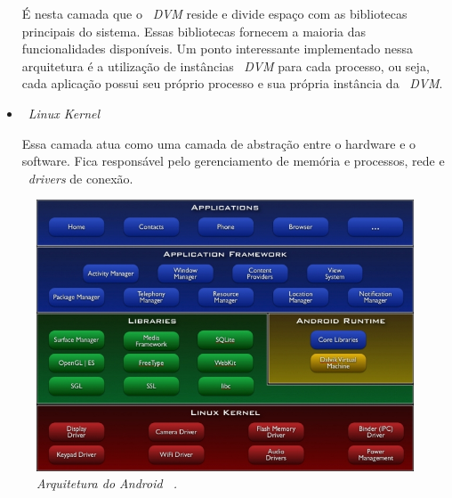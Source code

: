 \begin{itemize}
				É nesta camada que o ~\textit{DVM} reside e divide espaço com as bibliotecas principais do
				sistema. Essas bibliotecas fornecem a maioria das funcionalidades disponíveis. Um ponto interessante
				implementado nessa arquitetura é a utilização de instâncias ~\textit{DVM} para cada processo, ou
				seja, cada aplicação possui seu próprio processo e sua própria instância da ~\textit{DVM}. \\

			\item{~\emph{Linux Kernel} \\}
			
				Essa camada atua como uma camada de abstração entre o hardware e o software. Fica responsável
				pelo gerenciamento de memória e processos, rede e ~\textit{drivers} de conexão. \\
				
		\end{itemize}
	
	
		\begin{figure}[h]
			\centering \includegraphics[scale=.65]{figuras/anexos/androidArquitetura.jpg}
			\caption{\textit{Arquitetura do Android ~\cite{android}.}}
			\label{androidArquitetura} 
		\end{figure}
	


